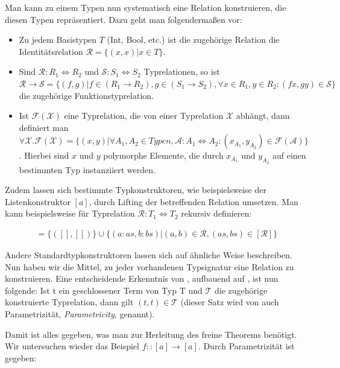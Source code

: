 \documentclass[11pt]{article} %
\begin{document}
Man kann zu einem Typen nun systematisch eine Relation konstruieren, die diesen Typen repräsentiert. Dazu geht man
folgendermaßen vor:

\begin{itemize}
\item Zu jedem Basistypen $T$ (Int, Bool, etc.) ist die zugehörige Relation die Identitätsrelation $\mathcal{R} = \{ (x, x) | x \in T\}$.
\item Sind $\mathcal{R} : R_1 \Leftrightarrow R_2$ und $\mathcal{S} : S_1 \Leftrightarrow S_2$ Typrelationen, so ist $\mathcal{R} \rightarrow \mathcal{S} = \{ (f, g) | f \in (R_1 \rightarrow R_2), g \in (S_1 \rightarrow S_2), \forall x \in R_1, y \in R_2: (f x, g y) \in \mathcal{S} \}$ die zugehörige Funktionstyprelation.
\item Ist $\mathcal{F}(\mathcal{X})$ eine Typrelation, die von einer Typrelation $\mathcal{X}$ abhängt, dann definiert man
$\forall \mathcal{X} . \mathcal{F}(\mathcal{X}) = \{ (x, y) | \forall A_1, A_2 \in Typen, \mathcal{A} : A_1 \Leftrightarrow A_2: 
(x_{A_1}, y_{A_2}) \in \mathcal{F}(\mathcal{A}) \}$. Hierbei sind $x$ und $y$ polymorphe Elemente, die durch $x_{A_1}$ und $y_{A_2}$
auf einen bestimmten Typ instanziiert werden.
\end{itemize}

Zudem lassen sich bestimmte Typkonstruktoren, wie beispielsweise der Listenkonstruktor $[a]$, durch Lifting der betreffenden
Relation umsetzen. Man kann beispielsweise für Typrelation $\mathcal{R} : T_1 \Leftrightarrow T_2$ rekursiv definieren:

\begin{align}
[\mathcal{R}] = \{ ([], []) \} \cup \{ (a : as, b : bs) | (a, b) \in \mathcal{R}, (as, bs) \in [\mathcal{R}] \}
\end{align}

Andere Standardtypkonstruktoren lassen sich auf ähnliche Weise beschreiben. Nun haben wir die Mittel, zu jeder vorhandenen
Typsignatur eine Relation zu konstruieren. Eine entscheidende Erkenntnis von \cite{wadler}, aufbauend auf
\cite{reynolds}, ist nun folgende: Ist t ein geschlossener Term von Typ T und $\mathcal{T}$ die zugehörige konstruierte
Typrelation, dann gilt $(t, t) \in \mathcal{T}$ (dieser Satz wird von \cite{wadler} auch Parametrizität, \textit{Parametricity}, genannt).

Damit ist alles gegeben, was man zur Herleitung des freine Theorems benötigt. Wir untersuchen wieder das Beispiel
$f :: [a] \rightarrow [a]$. Durch Parametrizität ist gegeben:
\end{document}
